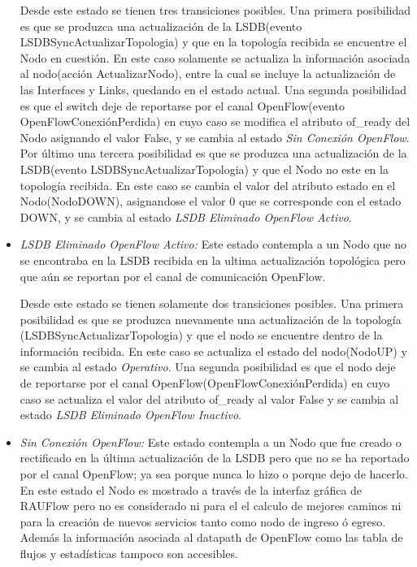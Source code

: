 \begin{itemize}
Desde este estado se tienen tres transiciones posibles. Una primera posibilidad es que se produzca una actualización de la LSDB(evento LSDBSyncActualizarTopologia) y que en la topolog\'ia recibida se encuentre el Nodo en cuesti\'on. En este caso solamente se actualiza la informaci\'on asociada al nodo(acción ActualizarNodo), entre la cual se incluye la actualización de las Interfaces y Links, quedando en el estado actual. Una segunda posibilidad es que el switch deje de reportarse por el canal OpenFlow(evento OpenFlowConexiónPerdida) en cuyo caso se modifica el atributo of\_ready del Nodo asignando el valor False, y se cambia al estado \textit{Sin Conexión OpenFlow}. Por \'ultimo una tercera posibilidad es que se produzca una actualizaci\'on de la LSDB(evento LSDBSyncActualizarTopologia) y que el Nodo no este en la topolog\'ia recibida. En este caso se cambia el valor del atributo estado en el Nodo(NodoDOWN), asignandose el valor 0 que se corresponde con el estado DOWN, y se cambia al estado \textit{LSDB Eliminado OpenFlow Activo}.

\item \textit{LSDB Eliminado OpenFlow Activo:} Este estado contempla a un Nodo que no se encontraba en la LSDB recibida en la ultima actualizaci\'on topol\'ogica pero que a\'un se reportan por el canal de comunicaci\'on OpenFlow.

Desde este estado se tienen solamente dos transiciones posibles. Una primera posibilidad es que se produzca nuevamente una actualización de la topolog\'ia 
(LSDBSyncActualizarTopologia) y que el nodo se encuentre dentro de la información recibida. En este caso se actualiza el estado del nodo(NodoUP) y se cambia al estado \textit{Operativo}. Una segunda posibilidad es que el nodo deje de reportarse por el canal OpenFlow(OpenFlowConexiónPerdida) en cuyo caso se actualiza el valor del atributo of\_ready al valor False y se cambia al estado \textit{LSDB Eliminado OpenFlow Inactivo}.

\item \textit{Sin Conexión OpenFlow:} Este estado contempla a un Nodo que fue creado o rectificado en la \'ultima actualización de la LSDB pero que no se ha reportado por el canal OpenFlow; ya sea porque nunca lo hizo o porque dejo de hacerlo. En este estado el Nodo es mostrado a trav\'es de la interfaz gr\'afica de RAUFlow pero no es considerado ni para el el calculo de mejores caminos ni para la creaci\'on de nuevos servicios tanto como nodo de ingreso \'o egreso. Adem\'as la informaci\'on asociada al datapath de OpenFlow como las tabla de flujos y estad\'isticas tampoco son accesibles.


\end{itemize}
